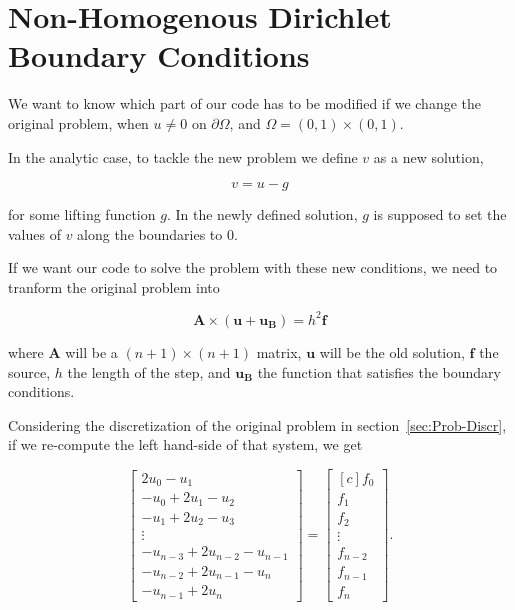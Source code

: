 \documentclass[fontsize=11pt,paper=a4,titlepage]{article}
\begin{document}
\section{Non-Homogenous Dirichlet Boundary Conditions}

We want to know which part of our code has to be modified if we change the
original problem, when $u \neq 0$ on $\partial\Omega$, and $\Omega = (0,1)
\times (0,1)$.

In the analytic case, to tackle the new problem we define $v$ as a new solution,

\begin{equation}
	v = u - g
\end{equation}

for some lifting function $g$. In the newly defined solution, $g$ is supposed to
set the values of $v$ along the boundaries to $0$.

If we want our code to solve the problem with these new conditions, we need to
tranform the original problem into

\begin{displaymath}
	\mathbf{A} \times (\mathbf{u} + \mathbf{u_B}) = h^2 \mathbf{f}
\end{displaymath}

where $\mathbf{A}$ will be a $(n + 1) \times (n + 1)$ matrix, $\mathbf{u}$ will
be the old solution, $\mathbf{f}$ the source, $h$ the length of the step, and
$\mathbf{u_B}$ the function that satisfies the boundary conditions.

Considering the discretization of the original problem in section~\ref{sec:Prob-Discr}, if we re-compute the left hand-side of that system, we get

\begin{displaymath}
\begin{bmatrix}
	2u_0 - u_1 \\
	- u_0 + 2u_1 - u_2 \\
	- u_1 + 2u_2 - u_3 \\
	\vdots \\
	- u_{n - 3} + 2u_{n - 2} - u_{n - 1} \\
	- u_{n - 2} + 2u_{n - 1} - u_{n} \\
	- u_{n - 1} + 2u_n
\end{bmatrix}
=
\begin{bmatrix*}[c]
	f_0 \\
	f_1 \\
	f_2 \\
	\vdots \\
	f_{n - 2} \\
	f_{n - 1} \\
	f_n
\end{bmatrix*}.
\end{displaymath}
\end{document}
